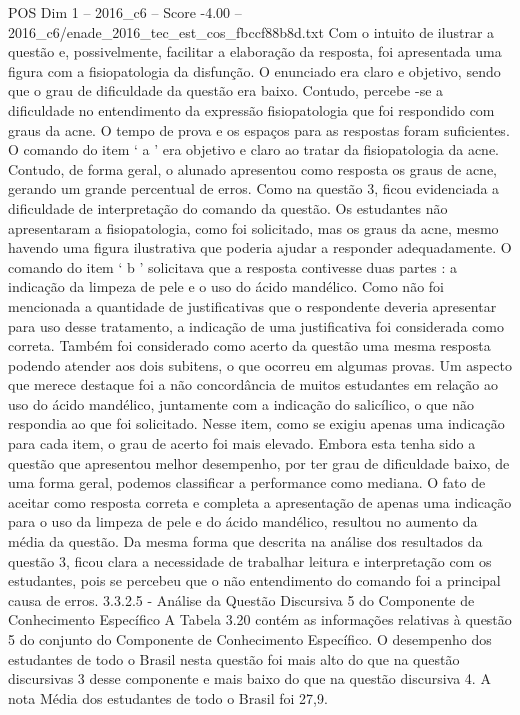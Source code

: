 \begin{textsample}{POS Dim 1 – 2016\_c6 – Score -4.00 – 2016\_c6/enade\_2016\_tec\_est\_cos\_fbccf88b8d.txt}
Com o intuito de ilustrar a questão e, possivelmente, facilitar a elaboração da resposta, foi apresentada uma figura com a fisiopatologia da disfunção.
O enunciado era claro e objetivo, sendo que o grau de dificuldade da questão era baixo.
Contudo, percebe -se a dificuldade no entendimento da expressão fisiopatologia que foi respondido com graus da acne.
O tempo de prova e os espaços para as respostas foram suficientes.
O comando do item ‘ a ’ era objetivo e claro ao tratar da fisiopatologia da acne.
Contudo, de forma geral, o alunado apresentou como resposta os graus de acne, gerando um grande percentual de erros.
Como na questão 3, ficou evidenciada a dificuldade de interpretação do comando da questão.
Os estudantes não apresentaram a fisiopatologia, como foi solicitado, mas os graus da acne, mesmo havendo uma figura ilustrativa que poderia ajudar a responder adequadamente.
O comando do item ‘ b ’ solicitava que a resposta contivesse duas partes : a indicação da limpeza de pele e o uso do ácido mandélico.
Como não foi mencionada a quantidade de justificativas que o respondente deveria apresentar para uso desse tratamento, a indicação de uma justificativa foi considerada como correta.
Também foi considerado como acerto da questão uma mesma resposta podendo atender aos dois subitens, o que ocorreu em algumas provas.
Um aspecto que merece destaque foi a não concordância de muitos estudantes em relação ao uso do ácido mandélico, juntamente com a indicação do salicílico, o que não respondia ao que foi solicitado.
Nesse item, como se exigiu apenas uma indicação para cada item, o grau de acerto foi mais elevado.
Embora esta tenha sido a questão que apresentou melhor desempenho, por ter grau de dificuldade baixo, de uma forma geral, podemos classificar a performance como mediana.
O fato de aceitar como resposta correta e completa a apresentação de apenas uma indicação para o uso da limpeza de pele e do ácido mandélico, resultou no aumento da média da questão.
Da mesma forma que descrita na análise dos resultados da questão 3, ficou clara a necessidade de trabalhar leitura e interpretação com os estudantes, pois se percebeu que o não entendimento do comando foi a principal causa de erros. 3.3.2.5 - Análise da Questão Discursiva 5 do Componente de Conhecimento Específico A Tabela 3.20 contém as informações relativas à questão 5 do conjunto do Componente de Conhecimento Específico.
O desempenho dos estudantes de todo o Brasil nesta questão foi mais alto do que na questão discursivas 3 desse componente e mais baixo do que na questão discursiva 4.
A nota Média dos estudantes de todo o Brasil foi 27,9.

\end{textsample}
